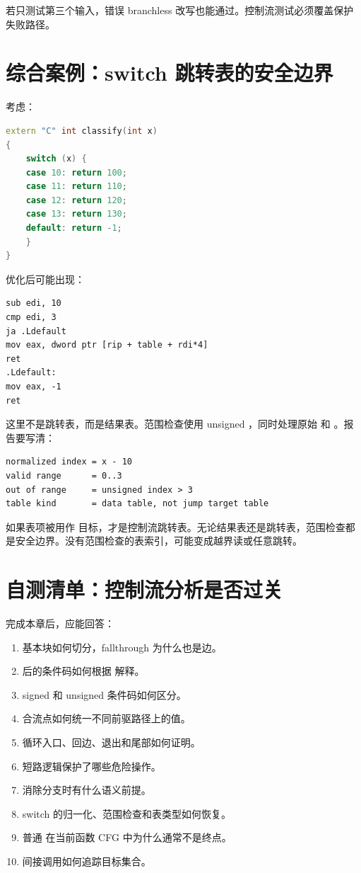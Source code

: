 若只测试第三个输入，错误 branchless 改写也能通过。控制流测试必须覆盖保护失败路径。

\section{综合案例：switch 跳转表的安全边界}

考虑：

\begin{lstlisting}[language=C++]
extern "C" int classify(int x)
{
    switch (x) {
    case 10: return 100;
    case 11: return 110;
    case 12: return 120;
    case 13: return 130;
    default: return -1;
    }
}
\end{lstlisting}

优化后可能出现：

\begin{lstlisting}
sub edi, 10
cmp edi, 3
ja .Ldefault
mov eax, dword ptr [rip + table + rdi*4]
ret
.Ldefault:
mov eax, -1
ret
\end{lstlisting}

这里不是跳转表，而是结果表。范围检查使用 unsigned ，同时处理原始  和 。报告要写清：

\begin{lstlisting}
normalized index = x - 10
valid range      = 0..3
out of range     = unsigned index > 3
table kind       = data table, not jump target table
\end{lstlisting}

如果表项被用作  目标，才是控制流跳转表。无论结果表还是跳转表，范围检查都是安全边界。没有范围检查的表索引，可能变成越界读或任意跳转。

\section{自测清单：控制流分析是否过关}

完成本章后，应能回答：

\begin{enumerate}
  \item 基本块如何切分，fallthrough 为什么也是边。
  \item {} 后的条件码如何根据  解释。
  \item signed 和 unsigned 条件码如何区分。
  \item 合流点如何统一不同前驱路径上的值。
  \item 循环入口、回边、退出和尾部如何证明。
  \item 短路逻辑保护了哪些危险操作。
  \item {} 消除分支时有什么语义前提。
  \item switch 的归一化、范围检查和表类型如何恢复。
  \item 普通  在当前函数 CFG 中为什么通常不是终点。
  \item 间接调用如何追踪目标集合。
\end{enumerate}

